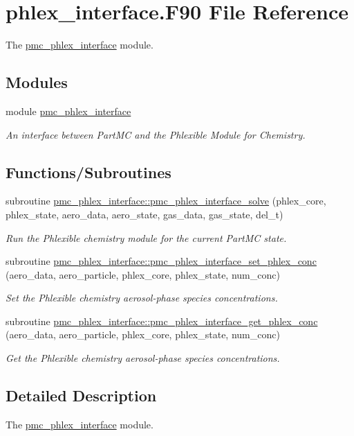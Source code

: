 \hypertarget{phlex__interface_8_f90}{}\section{phlex\+\_\+interface.\+F90 File Reference}
\label{phlex__interface_8_f90}


The \mbox{\hyperlink{namespacepmc__phlex__interface}{pmc\+\_\+phlex\+\_\+interface}} module.  


\subsection*{Modules}
\begin{DoxyCompactItemize}
\item 
module \mbox{\hyperlink{namespacepmc__phlex__interface}{pmc\+\_\+phlex\+\_\+interface}}
\begin{DoxyCompactList}\small\item\em An interface between Part\+MC and the Phlexible Module for Chemistry. \end{DoxyCompactList}\end{DoxyCompactItemize}
\subsection*{Functions/\+Subroutines}
\begin{DoxyCompactItemize}
\item 
subroutine \mbox{\hyperlink{namespacepmc__phlex__interface_aa62d09e99d1e6d81cd9ab31e4fec3db4}{pmc\+\_\+phlex\+\_\+interface\+::pmc\+\_\+phlex\+\_\+interface\+\_\+solve}} (phlex\+\_\+core, phlex\+\_\+state, aero\+\_\+data, aero\+\_\+state, gas\+\_\+data, gas\+\_\+state, del\+\_\+t)
\begin{DoxyCompactList}\small\item\em Run the Phlexible chemistry module for the current Part\+MC state. \end{DoxyCompactList}\item 
subroutine \mbox{\hyperlink{namespacepmc__phlex__interface_a856f9c1fb3526353bd573ab1e4a5ae5f}{pmc\+\_\+phlex\+\_\+interface\+::pmc\+\_\+phlex\+\_\+interface\+\_\+set\+\_\+phlex\+\_\+conc}} (aero\+\_\+data, aero\+\_\+particle, phlex\+\_\+core, phlex\+\_\+state, num\+\_\+conc)
\begin{DoxyCompactList}\small\item\em Set the Phlexible chemistry aerosol-\/phase species concentrations. \end{DoxyCompactList}\item 
subroutine \mbox{\hyperlink{namespacepmc__phlex__interface_a40607ba7c1278c70d004bbcdef0cc4d1}{pmc\+\_\+phlex\+\_\+interface\+::pmc\+\_\+phlex\+\_\+interface\+\_\+get\+\_\+phlex\+\_\+conc}} (aero\+\_\+data, aero\+\_\+particle, phlex\+\_\+core, phlex\+\_\+state, num\+\_\+conc)
\begin{DoxyCompactList}\small\item\em Get the Phlexible chemistry aerosol-\/phase species concentrations. \end{DoxyCompactList}\end{DoxyCompactItemize}


\subsection{Detailed Description}
The \mbox{\hyperlink{namespacepmc__phlex__interface}{pmc\+\_\+phlex\+\_\+interface}} module. 

